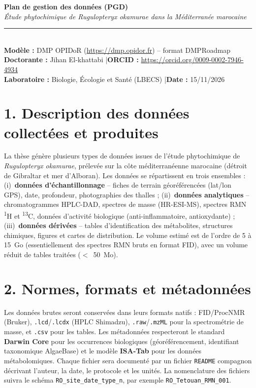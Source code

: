 \documentclass[11pt,a4paper]{article}
\begin{document}
\begin{center}
{\color{accent}\Large\bfseries Plan de gestion des données (PGD)}\\[2pt]
{\large\itshape Étude phytochimique de \textit{Rugulopteryx okamurae} dans la Méditerranée marocaine}\\[4pt]
\rule{0.95\linewidth}{0.4pt}\\[2pt]
\textbf{Modèle :} DMP OPIDoR (\url{https://dmp.opidor.fr}) -- format DMPRoadmap\\
\textbf{Doctorante :} Jihan El-khattabi \quad|\quad \textbf{ORCID :} \url{https://orcid.org/0009-0002-7946-4934}\\
\textbf{Laboratoire :} Biologie, Écologie et Santé (LBECS) \quad|\quad \textbf{Date :} 15/11/2026
\end{center}

\vspace{2pt}

\section*{1. Description des données collectées et produites}
La thèse génère plusieurs types de données issues de l'étude phytochimique de
\textit{Rugulopteryx okamurae}, prélevée sur la côte méditerranéenne marocaine
(détroit de Gibraltar et mer d'Alboran). Les données se répartissent en trois
ensembles : (i)~\textbf{données d'échantillonnage} -- fiches de terrain géoréférencées
(lat/lon GPS), date, profondeur, photographies des thalles ; (ii)~\textbf{données
analytiques} -- chromatogrammes HPLC-DAD, spectres de masse (HR-ESI-MS), spectres
RMN \textsuperscript{1}H et \textsuperscript{13}C, données d'activité biologique
(anti-inflammatoire, antioxydante) ; (iii)~\textbf{données dérivées} -- tables
d'identification des métabolites, structures chimiques, figures et cartes de
distribution. Le volume estimé est de l'ordre de 5 à 15~Go (essentiellement des
spectres RMN bruts en format FID), avec un volume réduit de tables traitées ($<$~50~Mo).

\section*{2. Normes, formats et métadonnées}
Les données brutes seront conservées dans leurs formats natifs : FID/ProcNMR
(Bruker), \texttt{.lcd}/\texttt{.lcdx} (HPLC Shimadzu), \texttt{.raw}/\texttt{.mzML}
pour la spectrométrie de masse, et \texttt{.csv} pour les tables. Les métadonnées
respecteront le standard \textbf{Darwin Core} pour les occurrences biologiques
(géoréférencement, identifiant taxonomique AlgaeBase) et le modèle \textbf{ISA-Tab}
pour les données métabolomiques. Chaque fichier sera documenté par un fichier
\texttt{README} compagnon décrivant l'auteur, la date, le protocole et les unités.
La nomenclature des fichiers suivra le schéma
\texttt{RO\_site\_date\_type\_n}, par exemple \texttt{RO\_Tetouan\_RMN\_001}.
\end{document}

